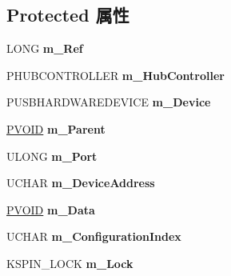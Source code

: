 \subsection*{Protected 属性}
\begin{DoxyCompactItemize}
\item 
\mbox{\label{class_c_u_s_b_device_a9bba1bbc63cf10294a6075287e069349}} 
L\+O\+NG {\bfseries m\+\_\+\+Ref}
\item 
\mbox{\label{class_c_u_s_b_device_a0b3c4f814d6698fa566969880636ff3e}} 
P\+H\+U\+B\+C\+O\+N\+T\+R\+O\+L\+L\+ER {\bfseries m\+\_\+\+Hub\+Controller}
\item 
\mbox{\label{class_c_u_s_b_device_a433100131c9be0b4a3eb2be8004a3941}} 
P\+U\+S\+B\+H\+A\+R\+D\+W\+A\+R\+E\+D\+E\+V\+I\+CE {\bfseries m\+\_\+\+Device}
\item 
\mbox{\label{class_c_u_s_b_device_a429501d0055161afa104118d32017da7}} 
\hyperlink{interfacevoid}{P\+V\+O\+ID} {\bfseries m\+\_\+\+Parent}
\item 
\mbox{\label{class_c_u_s_b_device_a6dec67d86b3892734a1e0cae9f6a6166}} 
U\+L\+O\+NG {\bfseries m\+\_\+\+Port}
\item 
\mbox{\label{class_c_u_s_b_device_ab0bf25ae797c1242e35bb253072633e8}} 
U\+C\+H\+AR {\bfseries m\+\_\+\+Device\+Address}
\item 
\mbox{\label{class_c_u_s_b_device_a8421ea5578099e53fff9e57cad590dea}} 
\hyperlink{interfacevoid}{P\+V\+O\+ID} {\bfseries m\+\_\+\+Data}
\item 
\mbox{\label{class_c_u_s_b_device_a7260f350cb7f9c1b21ca7a87b3ab07c9}} 
U\+C\+H\+AR {\bfseries m\+\_\+\+Configuration\+Index}
\item 
\mbox{\label{class_c_u_s_b_device_a32ae3cb78fc776de4ba17dc3ce1cfbea}} 
K\+S\+P\+I\+N\+\_\+\+L\+O\+CK {\bfseries m\+\_\+\+Lock}
\item 
\mbox{\label{class_c_u_s_b_device_a63e5fb5a0b2fa31b5f54043492858b1a}} 

\end{DoxyCompactItemize}
